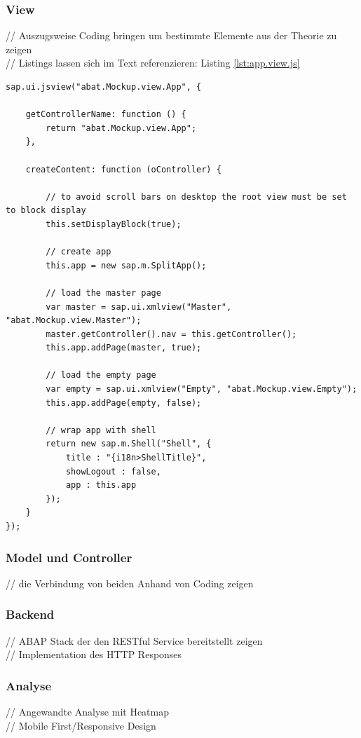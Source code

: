 \documentclass[12pt,a4paper,bibliography=totocnumbered,listof=totocnumbered]{scrartcl}
\begin{document}
\subsubsection{View}
// Auszugsweise Coding bringen um bestimmte Elemente aus der Theorie zu zeigen\\
// Listings lassen sich im Text referenzieren: Listing \ref{lst:app.view.js}
	\vspace{1em}
	\begin{lstlisting}[caption=Root View der Applikation, label=lst:app.view.js]
sap.ui.jsview("abat.Mockup.view.App", {

	getControllerName: function () {
		return "abat.Mockup.view.App";
	},
	
	createContent: function (oController) {
		
		// to avoid scroll bars on desktop the root view must be set to block display
		this.setDisplayBlock(true);
		
		// create app
		this.app = new sap.m.SplitApp();

		// load the master page
		var master = sap.ui.xmlview("Master", "abat.Mockup.view.Master");
		master.getController().nav = this.getController();
		this.app.addPage(master, true);
		
		// load the empty page
		var empty = sap.ui.xmlview("Empty", "abat.Mockup.view.Empty");
		this.app.addPage(empty, false);
		
		// wrap app with shell
		return new sap.m.Shell("Shell", {
			title : "{i18n>ShellTitle}",
			showLogout : false,
			app : this.app
		});
	}
});
	\end{lstlisting}

\subsubsection{Model und Controller}
// die Verbindung von beiden Anhand von Coding zeigen\\

\subsubsection{Backend}
// ABAP Stack der den RESTful Service bereitstellt zeigen\\
// Implementation des HTTP Responses\\

\subsubsection{Analyse}
// Angewandte Analyse mit Heatmap\\
// Mobile First/Responsive Design\\
\end{document}
